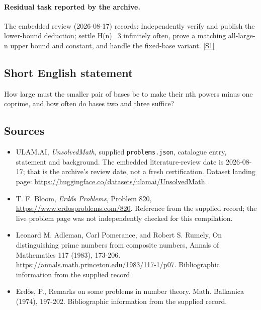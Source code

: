 \documentclass[11pt,a4paper]{article}
\newcommand{\sref}[2]{\hyperlink{source:#1:#2}{[S#2]}}
\begin{document}
\paragraph{Residual task reported by the archive.}

The embedded review (2026-08-17) records: Independently verify and publish the lower-bound deduction; settle H(n)=3 infinitely often, prove a matching all-large-n upper bound and constant, and handle the fixed-base variant. \sref{statement}{1}

\subsection{Short English statement}

How large must the smaller pair of bases be to make their nth powers minus one coprime, and how often do bases two and three suffice?

\subsection{Sources}

{\small

\begin{itemize}

\item[\hypertarget{source:statement:1}{S1}] ULAM.AI, \emph{UnsolvedMath}, supplied \texttt{problems.json}, catalogue entry, statement and background. The embedded literature-review date is 2026-08-17; that is the archive’s review date, not a fresh certification. Dataset landing page: \url{https://huggingface.co/datasets/ulamai/UnsolvedMath}.

\item[\hypertarget{source:statement:2}{S2}] T. F. Bloom, \emph{Erdős Problems}, Problem 820, \url{https://www.erdosproblems.com/820}. Reference from the supplied record; the live problem page was not independently checked for this compilation.

\item[\hypertarget{source:statement:3}{S3}] Leonard M. Adleman, Carl Pomerance, and Robert S. Rumely, On distinguishing prime numbers from composite numbers, Annals of Mathematics 117 (1983), 173-206. \url{https://annals.math.princeton.edu/1983/117-1/p07}. Bibliographic information from the supplied record.

\item[\hypertarget{source:statement:4}{S4}] Erd\H{o}s, P., Remarks on some problems in number theory. Math. Balkanica (1974), 197-202. Bibliographic information from the supplied record.

\end{itemize}

}

\label{end:statement}
\end{document}
